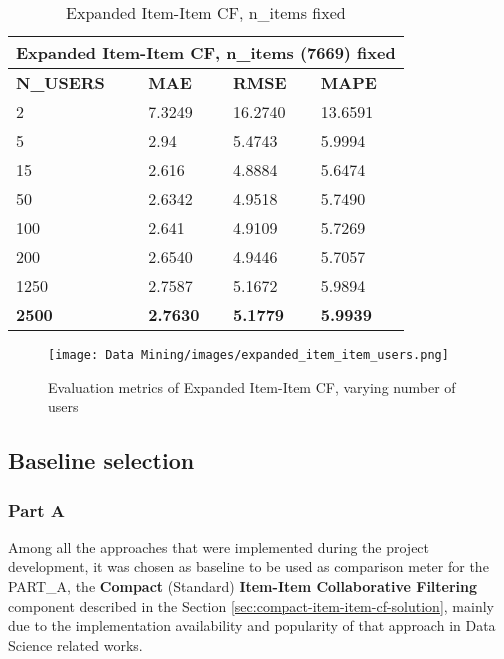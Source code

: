 \begin{table}[h!]
    \centering
    \begin{tabular}{ |p{2cm}||p{1.5cm}|p{1.5cm}|p{1.5cm}|  }
         \hline
         \multicolumn{4}{|c|}{Expanded Item-Item CF, n\_items (7669) fixed } \\
         \hline
         \textbf{N\_USERS}& \textbf{MAE} &\textbf{RMSE} &\textbf{MAPE}\\
         \hline
         2 & 7.3249 & 16.2740  & 13.6591\\
         5 & 2.94 & 5.4743  & 5.9994\\
         15 & 2.616  & 4.8884  & 5.6474\\
         50 & 2.6342 & 4.9518 & 5.7490\\
         100 & 2.641  & 4.9109 & 5.7269\\
         200 & 2.6540 & 4.9446 & 5.7057\\
         1250 & 2.7587 & 5.1672 & 5.9894\\
         \textbf{2500} & \textbf{2.7630} & \textbf{5.1779} & \textbf{5.9939}\\
 
         \hline
    \end{tabular}
    \caption{Expanded Item-Item CF, n\_items fixed}
    \label{tab:expanded Item-Item CF, nitems fixed}
\end{table}


\begin{figure}[h!]
\centering
\texttt{[image: Data Mining/images/expanded\_item\_item\_users.png]}
\caption{Evaluation metrics of Expanded Item-Item CF, varying number of users}
\label{fig:Expanded Item-Item CF, varying users}
\end{figure}




\subsection{Baseline selection}
\subsubsection{Part A}
\label{sec:baseline-partA}
Among all the approaches that were implemented during the project development, it was chosen as baseline to be used as comparison meter for the PART\_A, the \textbf{Compact} (Standard) \textbf{Item-Item Collaborative Filtering} component described in the Section \ref{sec:compact-item-item-cf-solution}, mainly due to the implementation availability and popularity of that approach in Data Science related works.

